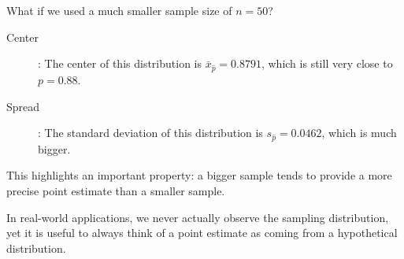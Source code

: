 \documentclass{beamer}
\begin{document}
\begin{frame}
  \begin{example}
    What if we used a much smaller sample size of $n=50$?\pause
    
    \vspace{0mm}
    \begin{description}
    \item[Center]: The center of this distribution is $\bar{x}_{\hat{p}}=0.8791$, which is still very close to $p=0.88$.\pause
    \item[Spread]: The standard deviation of this distribution is $s_{\hat{p}}= 0.0462$, which is much bigger.\pause
    \end{description}
  \end{example}

  \begin{note}
    This highlights an important property: a bigger sample tends to provide a more precise point estimate than a smaller sample.
  \end{note}\pause

  \begin{note}
    In real-world applications, we never actually observe the sampling distribution, yet it is useful to always think of a point estimate as coming from a hypothetical distribution.
  \end{note}
\end{frame}
\end{document}
